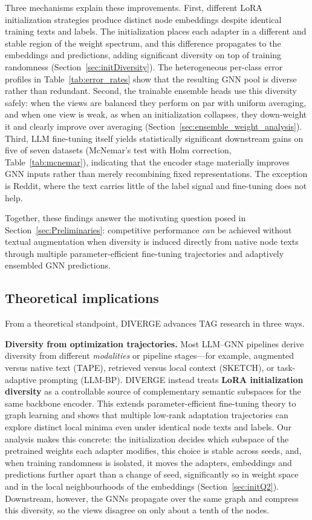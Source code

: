 \documentclass[a4paper,fleqn]{cas-sc}
\newcommand{\revthree}[1]{\textcolor{revgreen}{#1}} %
\DeclareRobustCommand{\revcommon}[2][]{\textcolor{revshared}{#2}} %
\begin{document}
Three mechanisms explain these improvements. First, different LoRA initialization strategies produce distinct node embeddings despite identical training texts and labels. \revcommon[R1,R2]{The initialization places each adapter in a different and stable region of the weight spectrum, and this difference propagates to the embeddings and predictions, adding significant diversity on top of training randomness (Section~\ref{sec:initDiversity}).} The heterogeneous per-class error profiles in Table~\ref{tab:error_rates} show that the resulting GNN pool is diverse rather than redundant. Second, \revcommon[R1,R2,R4]{the trainable ensemble heads use this diversity safely: when the views are balanced they perform on par with uniform averaging, and when one view is weak, as when an initialization collapses, they down-weight it and clearly improve over averaging (Section~\ref{sec:ensemble_weight_analysis}).} Third, \revthree{LLM fine-tuning itself yields statistically significant downstream gains on five of seven datasets (McNemar's test with Holm correction, Table~\ref{tab:mcnemar}), indicating that the encoder stage materially improves GNN inputs rather than merely recombining fixed representations. The exception is Reddit, where the text carries little of the label signal and fine-tuning does not help.}

Together, these findings answer the motivating question posed in Section~\ref{sec:Preliminaries}: competitive performance \emph{can} be achieved without textual augmentation when diversity is induced directly from native node texts through multiple parameter-efficient fine-tuning trajectories and adaptively ensembled GNN predictions.

\subsection{Theoretical implications}

From a theoretical standpoint, DIVERGE advances TAG research in three ways.

\textbf{Diversity from optimization trajectories.} Most LLM--GNN pipelines derive diversity from different \emph{modalities} or pipeline stages---for example, augmented versus native text (TAPE), retrieved versus local context (SKETCH), or task-adaptive prompting (LLM-BP). DIVERGE instead treats \textbf{LoRA initialization diversity} as a controllable source of complementary semantic subspaces for the same backbone encoder. This extends parameter-efficient fine-tuning theory \citep{Hu2021LoRA, meng2024pissa, paischer2024eva} to graph learning and shows that multiple low-rank adaptation trajectories can explore distinct local minima even under identical node texts and labels. \revcommon[R1,R2,R4]{Our analysis makes this concrete: the initialization decides which subspace of the pretrained weights each adapter modifies, this choice is stable across seeds, and, when training randomness is isolated, it moves the adapters, embeddings and predictions further apart than a change of seed, significantly so in weight space and in the local neighbourhoods of the embeddings (Section~\ref{sec:initQ2}). Downstream, however, the GNNs propagate over the same graph and compress this diversity, so the views disagree on only about a tenth of the nodes.}
\end{document}
